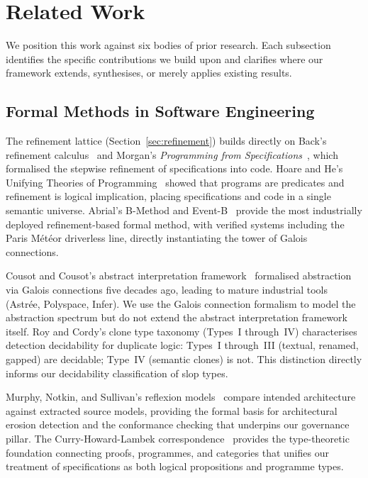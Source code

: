 \documentclass[11pt, a4paper, logo, copyright]{googledeepmind}
\begin{document}
\section{Related Work}
\label{sec:related}

We position this work against six bodies of prior research.  Each subsection
identifies the specific contributions we build upon and clarifies where our
framework extends, synthesises, or merely applies existing results.


\subsection{Formal Methods in Software Engineering}

The refinement lattice (Section~\ref{sec:refinement}) builds directly on Back's
refinement calculus~\citep{back1980correctness} and Morgan's \emph{Programming
from Specifications}~\citep{morgan1994programming}, which formalised the
stepwise refinement of specifications into code.  Hoare and He's Unifying
Theories of Programming~\citep{hoare1998unifying} showed that programs are
predicates and refinement is logical implication, placing specifications and
code in a single semantic universe.  Abrial's B-Method and
Event-B~\citep{abrial2010modeling} provide the most industrially deployed
refinement-based formal method, with verified systems including the Paris
M\'{e}t\'{e}or driverless line, directly instantiating the tower of Galois
connections.

Cousot and Cousot's abstract interpretation
framework~\citep{cousot1977abstract} formalised abstraction via Galois
connections five decades ago, leading to mature industrial tools (Astr\'{e}e,
Polyspace, Infer).  We use the Galois connection formalism to model the
abstraction spectrum but do not extend the abstract interpretation framework
itself.  Roy and Cordy's clone type taxonomy (Types~I through~IV) characterises
detection decidability for duplicate logic: Types~I through~III (textual,
renamed, gapped) are decidable; Type~IV (semantic clones) is not.  This
distinction directly informs our decidability classification of slop types.

Murphy, Notkin, and Sullivan's reflexion models~\citep{murphy1995, murphy2001}
compare intended architecture against extracted source models, providing the
formal basis for architectural erosion detection and the conformance checking
that underpins our governance pillar.  The Curry-Howard-Lambek
correspondence~\citep{wadler2015propositions} provides the type-theoretic
foundation connecting proofs, programmes, and categories that unifies our
treatment of specifications as both logical propositions and programme types.
\end{document}
